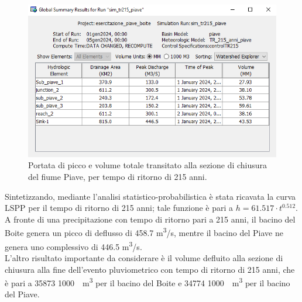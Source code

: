 \begin{figure}[H] \centering
\includegraphics[scale=0.6]{immagini/risul_piave_215.PNG}
\caption{Portata di picco e volume totale transitato alla sezione di chiusura del fiume Piave, per tempo di ritorno di 215 anni.}
\label{figure:risul_piave_215}
\end{figure}

Sintetizzando, mediante l'analisi statistico-probabilistica è stata ricavata la curva LSPP per il tempo di ritorno di 215 anni; tale funzione è pari a $h=61.517 \cdot t ^{0.512}$.\\
A fronte di una precipitazione con tempo di ritorno pari a 215 anni, il bacino del Boite genera un picco di deflusso di 458.7 \unit{m^3/s}, mentre il bacino del Piave ne genera uno complessivo di 446.5 \unit{m^3/s}.\\
L'altro risultato importante da considerare è il volume defluito alla sezione di chiusura alla fine dell'evento pluviometrico con tempo di ritorno di 215 anni, che è pari a 35873 \unit{1000 \cdot m^3} per il bacino del Boite e 34774 \unit{1000 \cdot m^3} per il bacino del Piave.